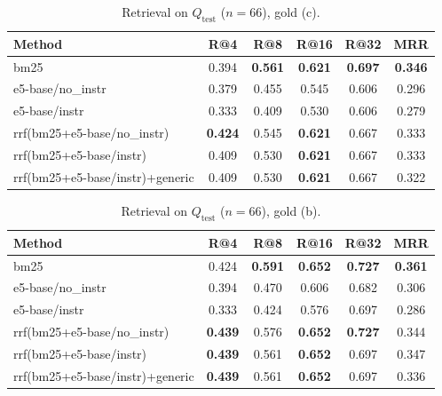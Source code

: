\begin{table}[t]
\centering
\caption{Retrieval on $Q_{\text{test}}$ ($n=66$), gold (c).}
\begin{tabular}{lccccc}
\toprule
Method & R@4 & R@8 & R@16 & R@32 & MRR \\
\midrule
bm25 & 0.394 & \textbf{0.561} & \textbf{0.621} & \textbf{0.697} & \textbf{0.346} \\
e5-base/no\_instr & 0.379 & 0.455 & 0.545 & 0.606 & 0.296 \\
e5-base/instr & 0.333 & 0.409 & 0.530 & 0.606 & 0.279 \\
rrf(bm25+e5-base/no\_instr) & \textbf{0.424} & 0.545 & \textbf{0.621} & 0.667 & 0.333 \\
rrf(bm25+e5-base/instr) & 0.409 & 0.530 & \textbf{0.621} & 0.667 & 0.333 \\
rrf(bm25+e5-base/instr)+generic & 0.409 & 0.530 & \textbf{0.621} & 0.667 & 0.322 \\
\bottomrule
\end{tabular}
\end{table}

\begin{table}[t]
\centering
\caption{Retrieval on $Q_{\text{test}}$ ($n=66$), gold (b).}
\begin{tabular}{lccccc}
\toprule
Method & R@4 & R@8 & R@16 & R@32 & MRR \\
\midrule
bm25 & 0.424 & \textbf{0.591} & \textbf{0.652} & \textbf{0.727} & \textbf{0.361} \\
e5-base/no\_instr & 0.394 & 0.470 & 0.606 & 0.682 & 0.306 \\
e5-base/instr & 0.333 & 0.424 & 0.576 & 0.697 & 0.286 \\
rrf(bm25+e5-base/no\_instr) & \textbf{0.439} & 0.576 & \textbf{0.652} & \textbf{0.727} & 0.344 \\
rrf(bm25+e5-base/instr) & \textbf{0.439} & 0.561 & \textbf{0.652} & 0.697 & 0.347 \\
rrf(bm25+e5-base/instr)+generic & \textbf{0.439} & 0.561 & \textbf{0.652} & 0.697 & 0.336 \\
\bottomrule
\end{tabular}
\end{table}
